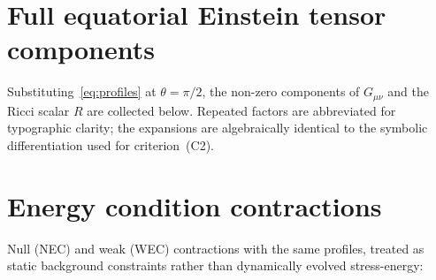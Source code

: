 \documentclass{iopjournal}
\newcommand{\Gmn}{G_{\mu\nu}}
\theoremstyle{remark}
\begin{document}
\appendix

\section{Full equatorial Einstein tensor components}
\label{app:tensors}

Substituting~\eqref{eq:profiles} at $\theta=\pi/2$, the non-zero components of $\Gmn$ and the Ricci scalar $R$ are collected below.
Repeated factors are abbreviated for typographic clarity; the expansions are algebraically identical to the symbolic differentiation used for criterion~(C2).

\section{Energy condition contractions}
\label{app:energy}

Null (NEC) and weak (WEC) contractions with the same profiles, treated as static background constraints rather than dynamically evolved stress-energy:

\clearpage


\end{document}
